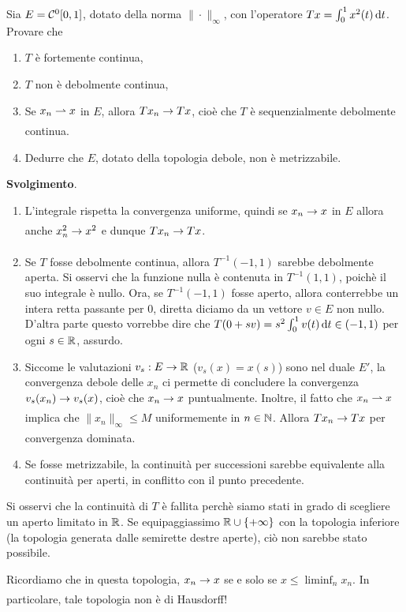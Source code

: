 \begin{exercise}
	Sia $E=\mathcal{C}^0[0,1]$, dotato della norma $\|\cdot\|_\infty$, con l'operatore $Tx = \int_0^1 x^2(t)\,\mathrm{d}t$. Provare che
	\begin{enumerate}
		\item $T$ è fortemente continua,
		\item $T$ non è debolmente continua,
		\item Se $x_n \rightharpoonup x$ in $E$, allora $Tx_n \underset{{}}{\rightarrow} Tx$, cioè che $T$ è sequenzialmente debolmente continua.
		\item Dedurre che $E$, dotato della topologia debole, non è metrizzabile.
	\end{enumerate}

	\textbf{Svolgimento}.
	\begin{enumerate}
		\item L'integrale rispetta la convergenza uniforme, quindi se $x_n \underset{{}}{\rightarrow} x$ in $E$ allora anche $x^2_n \underset{{}}{\rightarrow} x^2$ e dunque $Tx_n \underset{{}}{\rightarrow} Tx$.
		\item Se $T$ fosse debolmente continua, allora $T^{-1}(-1,1)$ sarebbe debolmente aperta. Si osservi che la funzione nulla è contenuta in $T^{-1}(1,1)$, poichè il suo integrale è nullo. Ora, se $T^{-1}(-1,1)$ fosse aperto, allora conterrebbe un intera retta passante per $0$, diretta diciamo da un vettore $v \in E$ non nullo. D'altra parte questo vorrebbe dire che $T(0+sv) = s^2 \int_0^1 v(t)\,\mathrm{d}t \in (-1,1)$ per ogni $s \in \mathbb{R}$, assurdo.
		\item Siccome le valutazioni $v_s : E \to \mathbb{R}$ ($v_s(x) = x(s)$) sono nel duale $E'$, la convergenza debole delle $x_n$ ci permette di concludere la convergenza $v_s(x_n) \underset{{}}{\rightarrow} v_s(x)$, cioè che $x_n \underset{{}}{\rightarrow} x$ puntualmente. Inoltre, il fatto che $x_n \rightharpoonup x$ implica che $\|x_n\|_\infty \leq M$ uniformemente in $n \in \mathbb{N}$.  Allora $Tx_n \underset{{}}{\rightarrow} Tx$ per convergenza dominata.
		\item Se fosse metrizzabile, la continuità per successioni sarebbe equivalente alla continuità per aperti, in conflitto con il punto precedente.
	\end{enumerate}
\end{exercise}

Si osservi che la continuità di $T$ è fallita perchè siamo stati in grado di scegliere un aperto limitato in $\mathbb{R}$. Se equipaggiassimo $\mathbb{R} \cup \{+\infty\}$ con la topologia inferiore (la topologia generata dalle semirette destre aperte), ciò non sarebbe stato possibile.

Ricordiamo che in questa topologia, $x_n \underset{{}}{\rightarrow} x$ se e solo se $x \leq \liminf_n x_n$. In particolare, tale topologia non è di Hausdorff!

